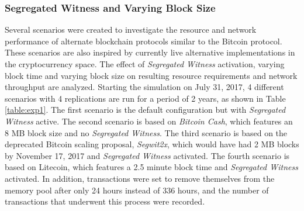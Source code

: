 \documentclass[12pt]{report}
\begin{document}
\subsubsection{Segregated Witness and Varying Block Size}
\label{sec:scenarios}
Several scenarios were created to investigate the resource and network performance of alternate blockchain protocols similar to the Bitcoin protocol. These scenarios are also inspired by currently live alternative implementations in the cryptocurrency space. The effect of \textit{Segregated Witness} activation, varying block time and varying block size on resulting resource requirements and network throughput are analyzed. Starting the simulation on July 31, 2017, 4 different scenarios with 4 replications are run for a period of 2 years, as shown in Table \ref{table:exp1}. The first scenario is the default configuration but with \textit{Segregated Witness} active. The second scenario is based on \textit{Bitcoin Cash}, which features an 8 MB block size and no \textit{Segregated Witness}. The third scenario is based on the deprecated Bitcoin scaling proposal, \textit{Segwit2x}, which would have had 2 MB blocks by November 17, 2017 and \textit{Segregated Witness} activated. The fourth scenario is based on Litecoin, which features a 2.5 minute block time and \textit{Segregated Witness} activated. In addition, transactions were set to remove themselves from the memory pool after only 24 hours instead of 336 hours, and the number of transactions that underwent this process were recorded.

\begin{comment}
\begin{center}
\captionof{table}{Setup for varying segregated witness activation and block size}
\begin{tabularx}{\textwidth}{XXXXXXX}
 \hline
  Config Name & Start Date & Hardfork & Hardfork Delay (days) & New Max Block Size (MB) & Block Time (min.) & Segwit\\ 
 \hline
 Default + Segwit & 7/31/17 & FALSE & N/A & N/A & 10 & TRUE \\ 
 \hline
 Bitcoin Cash & 7/31/17 & TRUE & 0 & 8 & 10 & FALSE \\
 \hline
 Segwit2x & 7/31/17 & TRUE & 109 & 2 & 10 & TRUE \\
 \hline
 Litecoin & 7/31/17 & FALSE & N/A & N/A & 2.5 & TRUE \\
 \hline
\label{table:exp1}
\end{tabularx}
\end{center}
\end{comment}
\end{document}
